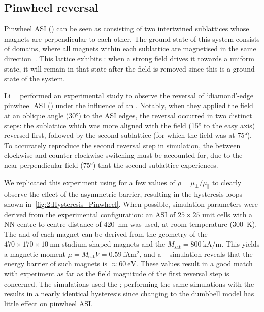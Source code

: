 \subsection{Pinwheel reversal}\label{sec:2:Applications_reversal_Pinwheel}
Pinwheel ASI () can be seen as consisting of two intertwined sublattices whose magnets are perpendicular to each other.
The ground state of this system consists of  domains, where all magnets within each sublattice are magnetised in the same direction~\cite{EmergentChiralityRatchet,ApparentFMpinwheel,RC_ASI}.
This lattice exhibits : when a strong field drives it towards a uniform state, it will remain in that state after the field is removed since this is a ground state of the system. \par
Li~\etal~\cite{li2018pinwheel} performed an experimental study to observe the reversal of `diamond'-edge pinwheel ASI () under the influence of an .
Notably, when they applied the field at an oblique angle (\ang{30}) to the ASI edges, the reversal occurred in two distinct steps: the sublattice which was more aligned with the field (\ang{15} to the easy axis) reversed first, followed by the second sublattice (for which the field was at \ang{75}).
To accurately reproduce the second reversal step in simulation, the  between clockwise and counter-clockwise switching must be accounted for, due to the near-perpendicular field (\ang{75}) that the second sublattice experiences. \par
We replicated this experiment using \hotspice for a few values of $\rho=\mu_\perp/\mu_\parallel$ to clearly observe the effect of the asymmetric barrier, resulting in the hysteresis loops shown in~\cref{fig:2:Hysteresis_Pinwheel}.
When possible, simulation parameters were derived from the experimental configuration: an ASI of $25 \times 25$ unit cells with a NN centre-to-centre distance of \SI{420}{\nano\meter} was used, at room temperature (\SI{300}{\kelvin}).
The  and  of each magnet can be derived from the geometry of the $470\times170\times\SI{10}{\nano\metre}$ stadium-shaped magnets and the   $M_\mathrm{sat}=\SI{800}{\kilo\ampere\per\metre}$.
This yields a magnetic moment $\mu = M_\mathrm{sat} V = \SI{0.59}{\femto\ampere\metre\squared}$, and a \mumax~\cite{mumax3} simulation reveals that the energy barrier of such magnets is $\approx \SI{60}{\electronvolt}$.
These values result in a good match with experiment as far as the field magnitude of the first reversal step is concerned.
The simulations used the ; performing the same simulations with the  results in a nearly identical hysteresis since changing to the dumbbell model has little effect on pinwheel ASI.

